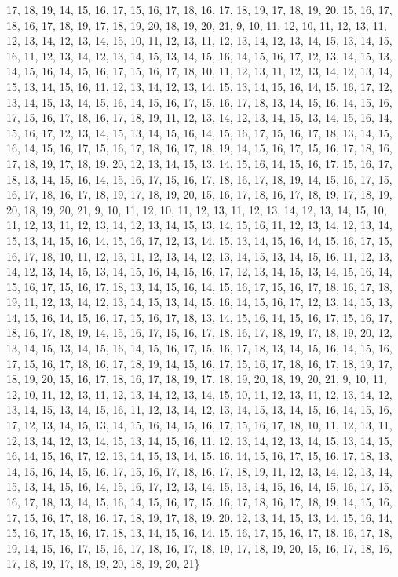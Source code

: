 \begin{DoxyCompactItemize}
17, 18, 19, 14, 15, 16, 17, 15, 16, 17, 18, 16, 17, 18, 19, 17, 18, 19, 20, 15, 16, 17, 18, 16, 17, 18, 19, 17, 18, 19, 20, 18, 19, 20, 21, 9, 10, 11, 12, 10, 11, 12, 13, 11, 12, 13, 14, 12, 13, 14, 15, 10, 11, 12, 13, 11, 12, 13, 14, 12, 13, 14, 15, 13, 14, 15, 16, 11, 12, 13, 14, 12, 13, 14, 15, 13, 14, 15, 16, 14, 15, 16, 17, 12, 13, 14, 15, 13, 14, 15, 16, 14, 15, 16, 17, 15, 16, 17, 18, 10, 11, 12, 13, 11, 12, 13, 14, 12, 13, 14, 15, 13, 14, 15, 16, 11, 12, 13, 14, 12, 13, 14, 15, 13, 14, 15, 16, 14, 15, 16, 17, 12, 13, 14, 15, 13, 14, 15, 16, 14, 15, 16, 17, 15, 16, 17, 18, 13, 14, 15, 16, 14, 15, 16, 17, 15, 16, 17, 18, 16, 17, 18, 19, 11, 12, 13, 14, 12, 13, 14, 15, 13, 14, 15, 16, 14, 15, 16, 17, 12, 13, 14, 15, 13, 14, 15, 16, 14, 15, 16, 17, 15, 16, 17, 18, 13, 14, 15, 16, 14, 15, 16, 17, 15, 16, 17, 18, 16, 17, 18, 19, 14, 15, 16, 17, 15, 16, 17, 18, 16, 17, 18, 19, 17, 18, 19, 20, 12, 13, 14, 15, 13, 14, 15, 16, 14, 15, 16, 17, 15, 16, 17, 18, 13, 14, 15, 16, 14, 15, 16, 17, 15, 16, 17, 18, 16, 17, 18, 19, 14, 15, 16, 17, 15, 16, 17, 18, 16, 17, 18, 19, 17, 18, 19, 20, 15, 16, 17, 18, 16, 17, 18, 19, 17, 18, 19, 20, 18, 19, 20, 21, 9, 10, 11, 12, 10, 11, 12, 13, 11, 12, 13, 14, 12, 13, 14, 15, 10, 11, 12, 13, 11, 12, 13, 14, 12, 13, 14, 15, 13, 14, 15, 16, 11, 12, 13, 14, 12, 13, 14, 15, 13, 14, 15, 16, 14, 15, 16, 17, 12, 13, 14, 15, 13, 14, 15, 16, 14, 15, 16, 17, 15, 16, 17, 18, 10, 11, 12, 13, 11, 12, 13, 14, 12, 13, 14, 15, 13, 14, 15, 16, 11, 12, 13, 14, 12, 13, 14, 15, 13, 14, 15, 16, 14, 15, 16, 17, 12, 13, 14, 15, 13, 14, 15, 16, 14, 15, 16, 17, 15, 16, 17, 18, 13, 14, 15, 16, 14, 15, 16, 17, 15, 16, 17, 18, 16, 17, 18, 19, 11, 12, 13, 14, 12, 13, 14, 15, 13, 14, 15, 16, 14, 15, 16, 17, 12, 13, 14, 15, 13, 14, 15, 16, 14, 15, 16, 17, 15, 16, 17, 18, 13, 14, 15, 16, 14, 15, 16, 17, 15, 16, 17, 18, 16, 17, 18, 19, 14, 15, 16, 17, 15, 16, 17, 18, 16, 17, 18, 19, 17, 18, 19, 20, 12, 13, 14, 15, 13, 14, 15, 16, 14, 15, 16, 17, 15, 16, 17, 18, 13, 14, 15, 16, 14, 15, 16, 17, 15, 16, 17, 18, 16, 17, 18, 19, 14, 15, 16, 17, 15, 16, 17, 18, 16, 17, 18, 19, 17, 18, 19, 20, 15, 16, 17, 18, 16, 17, 18, 19, 17, 18, 19, 20, 18, 19, 20, 21, 9, 10, 11, 12, 10, 11, 12, 13, 11, 12, 13, 14, 12, 13, 14, 15, 10, 11, 12, 13, 11, 12, 13, 14, 12, 13, 14, 15, 13, 14, 15, 16, 11, 12, 13, 14, 12, 13, 14, 15, 13, 14, 15, 16, 14, 15, 16, 17, 12, 13, 14, 15, 13, 14, 15, 16, 14, 15, 16, 17, 15, 16, 17, 18, 10, 11, 12, 13, 11, 12, 13, 14, 12, 13, 14, 15, 13, 14, 15, 16, 11, 12, 13, 14, 12, 13, 14, 15, 13, 14, 15, 16, 14, 15, 16, 17, 12, 13, 14, 15, 13, 14, 15, 16, 14, 15, 16, 17, 15, 16, 17, 18, 13, 14, 15, 16, 14, 15, 16, 17, 15, 16, 17, 18, 16, 17, 18, 19, 11, 12, 13, 14, 12, 13, 14, 15, 13, 14, 15, 16, 14, 15, 16, 17, 12, 13, 14, 15, 13, 14, 15, 16, 14, 15, 16, 17, 15, 16, 17, 18, 13, 14, 15, 16, 14, 15, 16, 17, 15, 16, 17, 18, 16, 17, 18, 19, 14, 15, 16, 17, 15, 16, 17, 18, 16, 17, 18, 19, 17, 18, 19, 20, 12, 13, 14, 15, 13, 14, 15, 16, 14, 15, 16, 17, 15, 16, 17, 18, 13, 14, 15, 16, 14, 15, 16, 17, 15, 16, 17, 18, 16, 17, 18, 19, 14, 15, 16, 17, 15, 16, 17, 18, 16, 17, 18, 19, 17, 18, 19, 20, 15, 16, 17, 18, 16, 17, 18, 19, 17, 18, 19, 20, 18, 19, 20, 21\}
\end{DoxyCompactItemize}


